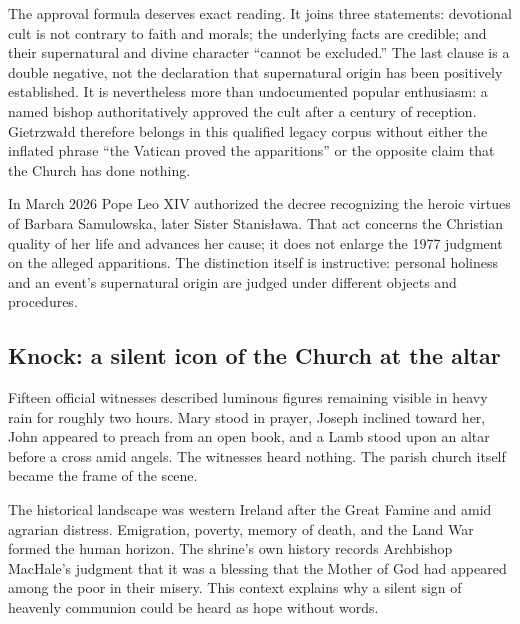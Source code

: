 The approval formula deserves exact reading. It joins three statements: devotional cult is not contrary to faith and morals; the underlying facts are credible; and their supernatural and divine character ``cannot be excluded.'' The last clause is a double negative, not the declaration that supernatural origin has been positively established. It is nevertheless more than undocumented popular enthusiasm: a named bishop authoritatively approved the cult after a century of reception. Gietrzwałd therefore belongs in this qualified legacy corpus without either the inflated phrase ``the Vatican proved the apparitions'' or the opposite claim that the Church has done nothing.

In March 2026 Pope Leo XIV authorized the decree recognizing the heroic virtues of Barbara Samulowska, later Sister Stanisława. That act concerns the Christian quality of her life and advances her cause; it does not enlarge the 1977 judgment on the alleged apparitions. The distinction itself is instructive: personal holiness and an event's supernatural origin are judged under different objects and procedures.

\subsection{Knock: a silent icon of the Church at the altar}


Fifteen official witnesses described luminous figures remaining visible in heavy rain for roughly two hours. Mary stood in prayer, Joseph inclined toward her, John appeared to preach from an open book, and a Lamb stood upon an altar before a cross amid angels. The witnesses heard nothing. The parish church itself became the frame of the scene.

The historical landscape was western Ireland after the Great Famine and amid agrarian distress. Emigration, poverty, memory of death, and the Land War formed the human horizon. The shrine's own history records Archbishop MacHale's judgment that it was a blessing that the Mother of God had appeared among the poor in their misery. This context explains why a silent sign of heavenly communion could be heard as hope without words.


